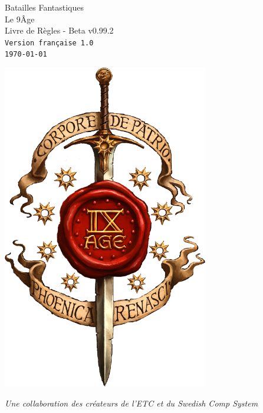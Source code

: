 
\begin{titlepage}
\begin{center}


{\fontsize{50}{60}\selectfont Batailles Fantastiques \\ Le 9\ieme Âge} \\
\vspace{0.7cm}
{\fontsize{20}{24}\selectfont Livre de Règles - Beta v0.99.2} \\
\vspace{0.4cm}
{\fontsize{14}{16.8}\selectfont \texttt{Version française 1.0}} \\
{\fontsize{14}{16.8}\selectfont \texttt{\today}} \\

\vfill

\includegraphics[width=9cm]{logo_9th.png}

\vfill

{\fontsize{12}{14.4}\selectfont \textit{Une collaboration des créateurs de l'ETC et du Swedish Comp System}} \\


\end{center}


\end{titlepage}
